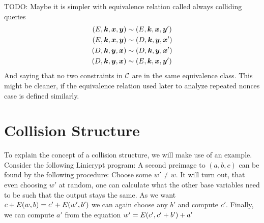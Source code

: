 TODO: Maybe it is simpler with equivalence relation called always colliding queries
\begin{align*}
    (E, \boldsymbol k,\boldsymbol x, \boldsymbol y) &\sim (E, \boldsymbol k, \boldsymbol x, \boldsymbol y') \\ 
    (E, \boldsymbol k,\boldsymbol x, \boldsymbol y) &\sim (D, \boldsymbol k, \boldsymbol y, \boldsymbol x') \\
    (D, \boldsymbol k,\boldsymbol y, \boldsymbol x) &\sim (D, \boldsymbol k, \boldsymbol y, \boldsymbol x') \\
    (D, \boldsymbol k,\boldsymbol y, \boldsymbol x) &\sim (E, \boldsymbol k, \boldsymbol x, \boldsymbol y')
\end{align*}
And saying that no two constraints in $\mathcal{C}$ are in the same equivalence class.
This might be cleaner, if the equivalence relation used later to analyze repeated nonces case is defined similarly.

\section{Collision Structure}

To explain the concept of a collision structure, we will make use of an example.
Consider the following Linicrypt program:
A second preimage to $(a,b,c)$ can be found by the following procedure:
Choose some $w' \neq w$.
It will turn out, that even choosing $w'$ at random,
one can calculate what the other base variables need to be such that the output stays the same.
As we want $c + E(w,b) = c' + E(w', b')$ we can again choose any $b'$ and compute $c'$. 
Finally, we can compute $a'$ from the equation $w' = E(c', c' + b') + a'$

